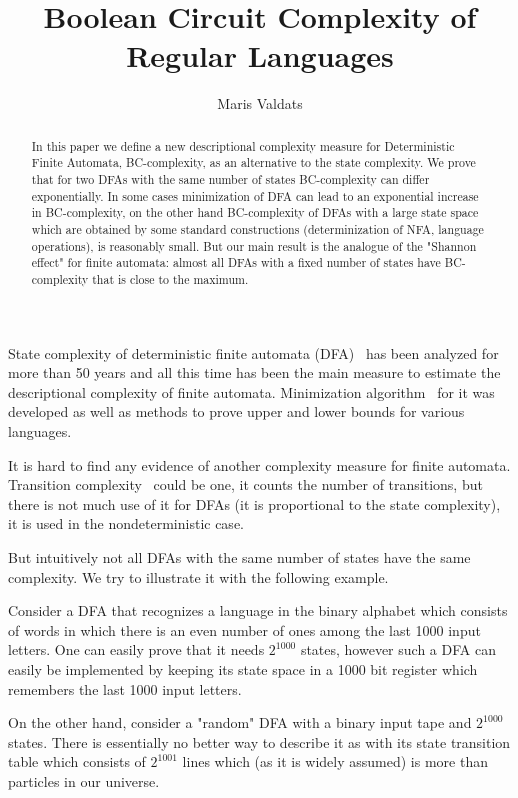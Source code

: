 \documentclass[copyright, creativecommons]{eptcs}
\title{Boolean Circuit Complexity of Regular Languages}
\author{Maris Valdats
\institute{University of Latvia\\
Faculty of Computing\\
Riga, Rai\c{n}a Bulv. 19, Latvia\\}
\email{d20416@lanet.lv}}
\begin{document}
\maketitle

\begin{abstract}
In this paper we define a new descriptional complexity measure for
Deterministic Finite Automata, BC-complexity, as an alternative to the state complexity.
We prove that for two DFAs with the same number of states BC-complexity can differ exponentially.
In some cases minimization of DFA can lead to an exponential increase in BC-complexity,
on the other hand BC-complexity of DFAs
with a large state space which are obtained by some standard constructions (determinization of NFA, language operations),
is reasonably small.
But our main result is the analogue of the "Shannon effect" for finite automata:
almost all DFAs with a fixed number of states have BC-complexity that is close to the maximum.
\end{abstract}
\label{1nod}
 State complexity of deterministic finite automata (DFA)~\cite{B70}\cite{H79} has been analyzed for more than
50 years and all this time has been
the main measure to estimate the descriptional complexity of finite automata. Minimization algorithm~\cite{H71}
for it was developed as well as methods to prove upper and lower bounds for various languages.

It is hard to
find any evidence of another complexity measure for finite automata.
Transition complexity~\cite{G05} could be one, it counts the number
of transitions, but there is not much use of it for DFAs (it is proportional to the state complexity),
it is used in the nondeterministic case.

But intuitively not all DFAs with the same number of states have the same complexity.
We try to illustrate it with the following example.

Consider a DFA that recognizes a language in the binary alphabet
which consists of words in which there is an even number of ones
among the last 1000 input letters. One can easily prove that it needs $2^{1000}$ states,
however such a DFA can easily be implemented by keeping its
state space in a 1000 bit register which remembers the last 1000 input letters.

On the other hand, consider a "random" DFA with a binary input tape and $2^{1000}$ states. There is essentially no better way
to describe it as with its state transition table which consists of $2^{1001}$ lines which (as it is widely
assumed) is more than particles in our universe.
\end{document}
